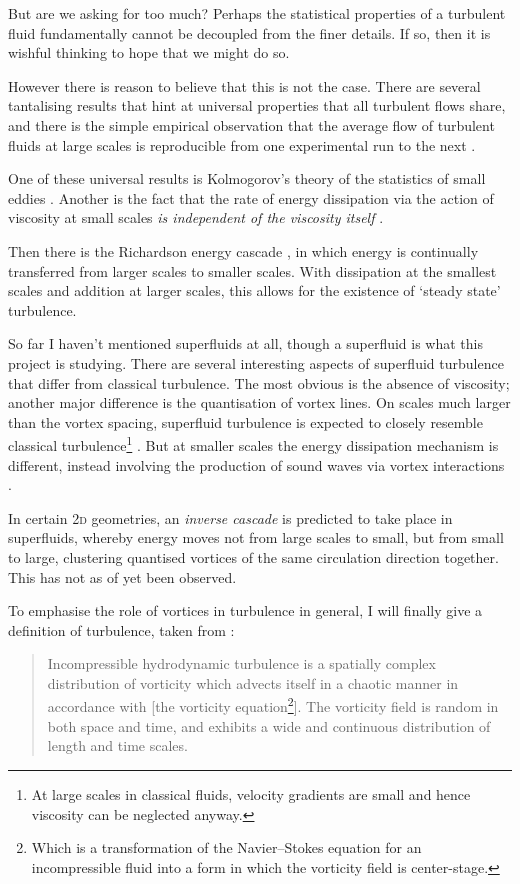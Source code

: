 But are we asking for too much? Perhaps the statistical properties of a turbulent fluid fundamentally cannot be decoupled from the finer details. If so, then it is wishful thinking to hope that we might do so.

However there is reason to believe that this is not the case. There are several tantalising results that hint at universal properties that all turbulent flows share, and there is the simple empirical observation that the average flow of turbulent fluids at large scales is reproducible from one experimental run to the next \cite[pp 13, 86]{davidson_turbulence:_2004}.

One of these universal results is Kolmogorov's theory of the statistics of small eddies \cite{kolmogorov_local_1941, spalding_kolmogorovs_1991}. Another is the fact that the rate of energy dissipation via the action of viscosity at small scales \emph{is independent of the viscosity itself} \cite[p 77]{davidson_turbulence:_2004}.

Then there is the Richardson energy cascade \cite{richardson_weather_2007}, in which energy is continually transferred from larger scales to smaller scales. With dissipation at the smallest scales and addition at larger scales, this allows for the existence of `steady state' turbulence.

So far I haven't mentioned superfluids at all, though a superfluid is what this project is studying. There are several interesting aspects of superfluid turbulence that differ from classical turbulence. The most obvious is the absence of viscosity;  another major difference is the quantisation of vortex lines. On scales much larger than the vortex spacing, superfluid turbulence is expected to closely resemble classical turbulence\footnote{At large scales in classical fluids, velocity gradients are small and hence viscosity can be neglected anyway.} \cite{tsubota_energy_2009}. But at smaller scales the energy dissipation mechanism is different, instead involving the production of sound waves via vortex interactions \cite{tsubota_energy_2009, vinen_how_2005}.

In certain 2\textsc{d} geometries, an \emph{inverse cascade} \cite{onsager_statistical_1949, kraichnan_inertial_1967} is predicted to take place in superfluids, whereby energy moves not from large scales to small, but from small to large, clustering quantised vortices of the same circulation direction together. This has not as of yet been observed.

To emphasise the role of vortices in turbulence in general, I will finally give a definition of turbulence, taken from \cite[p 53]{davidson_turbulence:_2004}:
\begin{quote}
Incompressible hydrodynamic turbulence is a spatially complex distribution of vorticity which advects itself in a chaotic manner in accordance with [the vorticity equation\footnote{Which is a transformation of the Navier--Stokes equation for an incompressible fluid into a form in which the vorticity field is center-stage.}]. The vorticity field is random in both space and time, and exhibits a wide and continuous distribution of length and time scales.
\end{quote}

